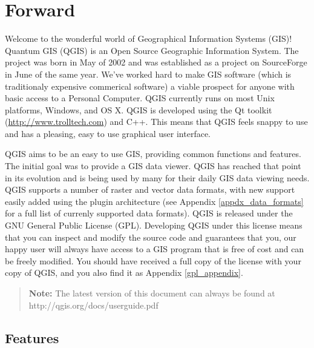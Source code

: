 
\section{Forward}\label{label_forward}
\setcounter{page}{1}

Welcome to the wonderful world of Geographical Information Systems (GIS)!
Quantum GIS (QGIS) is an Open Source Geographic Information System. The project
was born in May of 2002 and was established as a project on SourceForge in June
of the same year. We've worked hard to make GIS software (which is traditionaly
expensive commerical software) a viable prospect for anyone with basic access
to a Personal Computer. QGIS currently runs on most Unix platforms, Windows, and
OS X. QGIS is developed using the Qt toolkit (\url{http://www.trolltech.com})
and C++. This means that QGIS feels snappy to use and has a pleasing, easy to
use graphical user interface. 

QGIS aims to be an easy to use GIS, providing common functions and features.
The initial goal was to provide a GIS data viewer. QGIS has reached that point
in its evolution and is being used by many for their daily GIS data viewing
needs. QGIS supports a number of raster and vector data formats, with new
support easily added using the plugin architecture (see Appendix
\ref{appdx_data_formats} for a full list of currenly supported data formats).
QGIS is released under the GNU General Public License (GPL). Developing QGIS 
under this license means that you can inspect and modify the source code
and guarantees that you, our happy user will always have access to a GIS
program that is free of cost and can be freely modified. You should have
received a full copy of the license with your copy of QGIS, and you also
find it as Appendix \ref{gpl_appendix}.  

\begin{quote}
\begin{center}
\textbf{Note:} The latest version of this document can always be found at \newline
http://qgis.org/docs/userguide.pdf 
\end{center}
\end{quote}

\subsection{Features}\label{label_majfeat}

